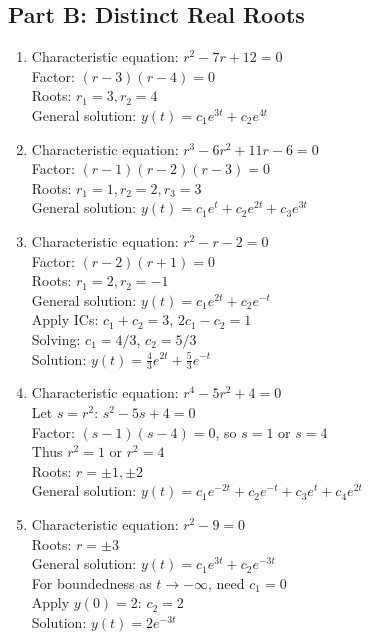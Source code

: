 \documentclass[12pt]{article}
\begin{document}
\subsection*{Part B: Distinct Real Roots}

\begin{enumerate}[resume]
\item Characteristic equation: $r^2 - 7r + 12 = 0$\\
Factor: $(r-3)(r-4) = 0$\\
Roots: $r_1 = 3, r_2 = 4$\\
General solution: $y(t) = c_1e^{3t} + c_2e^{4t}$

\item Characteristic equation: $r^3 - 6r^2 + 11r - 6 = 0$\\
Factor: $(r-1)(r-2)(r-3) = 0$\\
Roots: $r_1 = 1, r_2 = 2, r_3 = 3$\\
General solution: $y(t) = c_1e^t + c_2e^{2t} + c_3e^{3t}$

\item Characteristic equation: $r^2 - r - 2 = 0$\\
Factor: $(r-2)(r+1) = 0$\\
Roots: $r_1 = 2, r_2 = -1$\\
General solution: $y(t) = c_1e^{2t} + c_2e^{-t}$\\
Apply ICs: $c_1 + c_2 = 3$, $2c_1 - c_2 = 1$\\
Solving: $c_1 = 4/3$, $c_2 = 5/3$\\
Solution: $y(t) = \frac{4}{3}e^{2t} + \frac{5}{3}e^{-t}$

\item Characteristic equation: $r^4 - 5r^2 + 4 = 0$\\
Let $s = r^2$: $s^2 - 5s + 4 = 0$\\
Factor: $(s-1)(s-4) = 0$, so $s = 1$ or $s = 4$\\
Thus $r^2 = 1$ or $r^2 = 4$\\
Roots: $r = \pm 1, \pm 2$\\
General solution: $y(t) = c_1e^{-2t} + c_2e^{-t} + c_3e^t + c_4e^{2t}$

\item Characteristic equation: $r^2 - 9 = 0$\\
Roots: $r = \pm 3$\\
General solution: $y(t) = c_1e^{3t} + c_2e^{-3t}$\\
For boundedness as $t \to -\infty$, need $c_1 = 0$\\
Apply $y(0) = 2$: $c_2 = 2$\\
Solution: $y(t) = 2e^{-3t}$
\end{enumerate}
\end{document}
